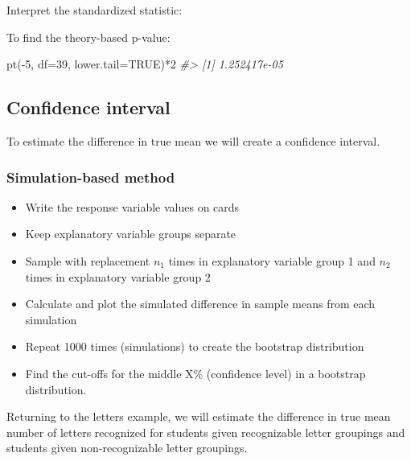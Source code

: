 \documentclass[
]{report}
\newenvironment{Shaded}{\begin{snugshade}}{\end{snugshade}}
\newcommand{\AttributeTok}[1]{\textcolor[rgb]{0.77,0.63,0.00}{#1}}
\newcommand{\CommentTok}[1]{\textcolor[rgb]{0.56,0.35,0.01}{\textit{#1}}}
\newcommand{\ConstantTok}[1]{\textcolor[rgb]{0.00,0.00,0.00}{#1}}
\newcommand{\DecValTok}[1]{\textcolor[rgb]{0.00,0.00,0.81}{#1}}
\newcommand{\FunctionTok}[1]{\textcolor[rgb]{0.00,0.00,0.00}{#1}}
\newcommand{\NormalTok}[1]{#1}
\newcommand{\SpecialCharTok}[1]{\textcolor[rgb]{0.00,0.00,0.00}{#1}}
\begin{document}
Interpret the standardized statistic:

\vspace{0.8in}

To find the theory-based p-value:

\begin{Shaded}
\begin{Highlighting}[]
\FunctionTok{pt}\NormalTok{(}\SpecialCharTok{{-}}\DecValTok{5}\NormalTok{, }\AttributeTok{df=}\DecValTok{39}\NormalTok{, }\AttributeTok{lower.tail=}\ConstantTok{TRUE}\NormalTok{)}\SpecialCharTok{*}\DecValTok{2}
\CommentTok{\#\textgreater{} [1] 1.252417e{-}05}
\end{Highlighting}
\end{Shaded}

\hypertarget{confidence-interval-5}{%
\subsection*{Confidence interval}\label{confidence-interval-5}}

To estimate the difference in true mean we will create a confidence interval.

\hypertarget{simulation-based-method-6}{%
\subsubsection*{Simulation-based method}\label{simulation-based-method-6}}

\begin{itemize}
\item
  Write the response variable values on cards
\item
  Keep explanatory variable groups separate
\item
  Sample with replacement \(n_1\) times in explanatory variable group 1 and \(n_2\) times in explanatory variable group 2
\item
  Calculate and plot the simulated difference in sample means from each simulation
\item
  Repeat 1000 times (simulations) to create the bootstrap distribution
\item
  Find the cut-offs for the middle X\% (confidence level) in a bootstrap distribution.
\end{itemize}

Returning to the letters example, we will estimate the difference in true mean number of letters recognized for students given recognizable letter groupings and students given non-recognizable letter groupings.
\end{document}

